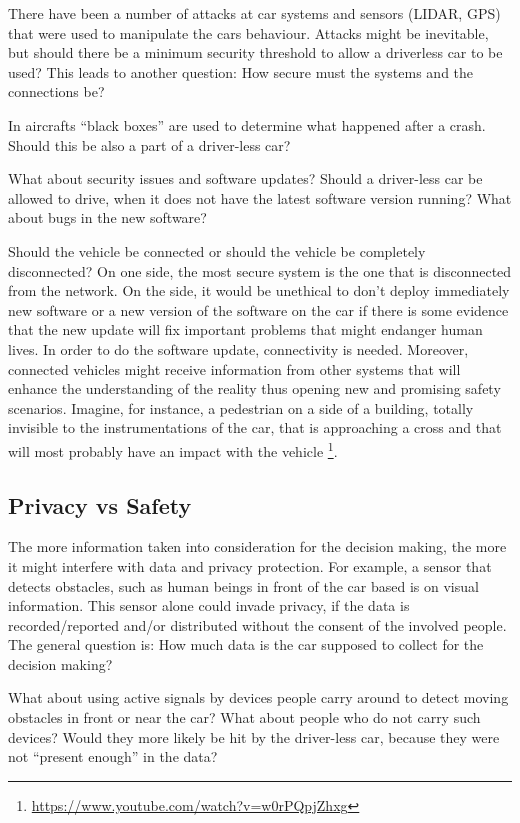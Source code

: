 There have been a number of attacks at car systems and sensors (LIDAR, GPS) that were used to manipulate the cars behaviour. Attacks might be inevitable, but should there be a minimum security threshold to allow a driverless car to be used? This leads to another question: How secure must the systems and the connections be? 

In aircrafts \enquote{black boxes} are used to determine what happened after a crash. Should this be also a part of a driver-less car? 

What about security issues and software updates? Should a driver-less car be allowed to drive, when it does not have the latest software version running? What about bugs in the new software?

Should the vehicle be connected or should the vehicle be completely disconnected? On one side, the most secure system is the one that is disconnected from the network. On the side, it would be unethical to don’t deploy immediately new software or a new version of the software on the car if there is some evidence that the new update will fix important problems that might endanger human lives. In order to do the software update, connectivity is needed. Moreover, connected vehicles might receive information from other systems that will enhance the understanding of the reality thus opening new and promising safety scenarios. Imagine, for instance, a pedestrian on a side of a building, totally invisible to the instrumentations of the car, that is approaching a cross and that will most probably have an impact with the vehicle \footnote{\url{https://www.youtube.com/watch?v=w0rPQpjZhxg}}. 


\subsection{Privacy vs Safety}
\label{sec:EAofTC:PrivacyVSSafety}

The more information taken into consideration for the decision making, the more it might interfere with data and privacy protection. For example, a sensor that detects obstacles, such as human beings in front of the car based is on visual information. This sensor alone could invade privacy, if the data is recorded/reported and/or distributed without the consent of the involved people. The general question is: How much data is the car supposed to collect for the decision making?

What about using active signals by devices people carry around to detect moving obstacles in front or near the car? What about people who do not carry such devices? Would they more likely be hit by the driver-less car, because they were not \enquote{present enough} in the data?

